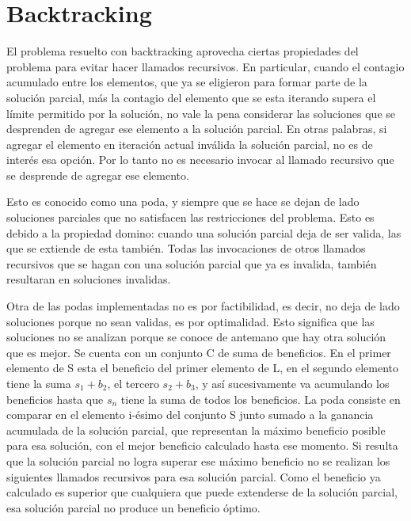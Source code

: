\documentclass[10pt,a4paper]{article}
\begin{document}
\section{Backtracking} \label{sec:backtracking}

El problema resuelto con backtracking aprovecha ciertas propiedades del problema para evitar hacer llamados recursivos. En particular, cuando el contagio acumulado entre los elementos, que ya se eligieron para formar parte de la solución parcial, más la contagio del elemento que se esta iterando supera el límite permitido por la solución, no vale la pena considerar las soluciones que se desprenden de agregar ese elemento a la solución parcial. En otras palabras, si agregar el elemento en iteración actual inválida la solución parcial, no es de interés esa opción. Por lo tanto no es necesario invocar al llamado recursivo que se desprende de agregar ese elemento. 

Esto es conocido como una poda, y siempre que se hace se dejan de lado soluciones parciales que no satisfacen las restricciones del problema. Esto es debido a la propiedad domino: cuando una solución parcial deja de ser valida, las que se extiende de esta también. Todas las invocaciones de otros llamados recursivos que se hagan con una solución parcial que ya es invalida, también resultaran en soluciones invalidas.

Otra de las podas implementadas no es por factibilidad, es decir, no deja de lado soluciones porque no sean validas, es por optimalidad. Esto significa que las soluciones no se analizan porque se conoce de antemano que hay otra solución que es mejor. Se cuenta con un conjunto C de suma de beneficios. En el primer elemento de S esta el beneficio del primer elemento de L, en el segundo elemento tiene la suma $s_1+b_2$, el tercero $s_2+b_3$, y así sucesivamente va acumulando los beneficios hasta que  $s_n$ tiene la suma de todos los beneficios. La poda consiste en comparar en el elemento i-ésimo del conjunto S junto sumado a la ganancia acumulada de la solución parcial, que representan la máximo beneficio posible para esa solución, con el mejor beneficio calculado hasta ese momento. Si resulta que la solución parcial no logra superar ese máximo beneficio no se realizan los siguientes llamados recursivos para esa solución parcial. Como el beneficio ya calculado es superior que cualquiera que puede extenderse de la solución parcial, esa solución parcial no produce un beneficio óptimo.
\end{document}
